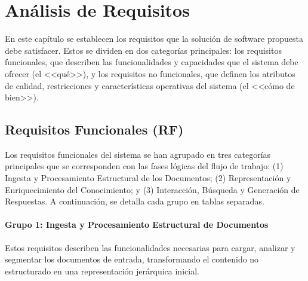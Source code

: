 ﻿\chapter{Análisis de Requisitos}
\label{chap:requisitos}

En este capítulo se establecen los requisitos que la solución de software propuesta debe satisfacer. Estos se dividen en dos categorías principales: los requisitos funcionales, que describen las funcionalidades y capacidades que el sistema debe ofrecer (el <<qué>>), y los requisitos no funcionales, que definen los atributos de calidad, restricciones y características operativas del sistema (el <<cómo de bien>>).

\section{Requisitos Funcionales (RF)}
\label{sec:rf}

Los requisitos funcionales del sistema se han agrupado en tres categorías principales que se corresponden con las fases lógicas del flujo de trabajo: (1) Ingesta y Procesamiento Estructural de los Documentos; (2) Representación y Enriquecimiento del Conocimiento; y (3) Interacción, Búsqueda y Generación de Respuestas. A continuación, se detalla cada grupo en tablas separadas.
\newpage
\subsubsection*{Grupo 1: Ingesta y Procesamiento Estructural de Documentos}
Estos requisitos describen las funcionalidades necesarias para cargar, analizar y segmentar los documentos de entrada, transformando el contenido no estructurado en una representación jerárquica inicial.

